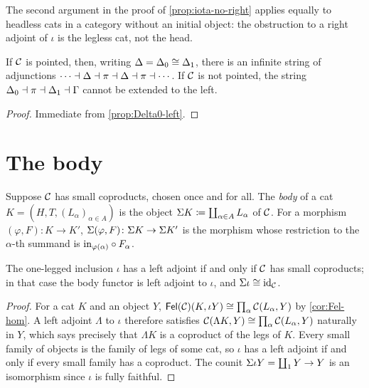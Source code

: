 \begin{remark}\label{rem:legless-obstruction}
The second argument in the proof of \cref{prop:iota-no-right} applies equally to
headless cats in a category without an initial object: the obstruction to a
right adjoint of $\iota$ is the legless cat, not the head.
\end{remark}

\begin{proposition}\label{prop:pointed-infinite}
If $\mathcal{C}$ is pointed, then, writing $\Delta=\Delta_0\cong\Delta_1$, there is an
infinite string of adjunctions
$\cdots\dashv\Delta\dashv\pi\dashv\Delta\dashv\pi\dashv\cdots$. If $\mathcal{C}$
is not pointed, the string $\Delta_0\dashv\pi\dashv\Delta_1\dashv\Gamma$
cannot be extended to the left.
\end{proposition}

\begin{proof}
Immediate from \cref{prop:Delta0-left}.
\end{proof}

\section{The body}\label{sec:body}

\begin{definition}\label{def:body}
Suppose $\mathcal{C}$ has small coproducts, chosen once and for all. The \emph{body}
of a cat $K=(H,T,(L_\alpha)_{\alpha\in A})$ is the object
$\Sigma K\coloneqq\coprod_{\alpha\in A}L_\alpha$ of $\mathcal{C}$. For a morphism
$(\varphi,F)\colon K\to K'$, $\Sigma(\varphi,F)\colon\Sigma K\to\Sigma K'$ is the
morphism whose restriction to the $\alpha$-th summand is
$\mathrm{in}_{\varphi(\alpha)}\circ F_\alpha$.
\end{definition}

\begin{proposition}\label{prop:body-adjoint}
The one-legged inclusion $\iota$ has a left adjoint if and only if $\mathcal{C}$ has
small coproducts; in that case the body functor is left adjoint to $\iota$,
and $\Sigma\iota\cong\mathrm{id}_{\mathcal{C}}$.
\end{proposition}

\begin{proof}
For a cat $K$ and an object $Y$,
$\mathsf{Fel}(\mathcal{C})(K,\iota Y)\cong\prod_\alpha\mathcal{C}(L_\alpha,Y)$ by \cref{cor:Fel-hom}. A
left adjoint $\Lambda$ to $\iota$ therefore satisfies
$\mathcal{C}(\Lambda K,Y)\cong\prod_\alpha\mathcal{C}(L_\alpha,Y)$ naturally in $Y$, which says
precisely that $\Lambda K$ is a coproduct of the legs of $K$. Every small family
of objects is the family of legs of some cat, so $\iota$ has a left adjoint if
and only if every small family has a coproduct. The counit
$\Sigma\iota Y=\coprod_{1}Y\to Y$ is an isomorphism since $\iota$ is fully
faithful.
\end{proof}


